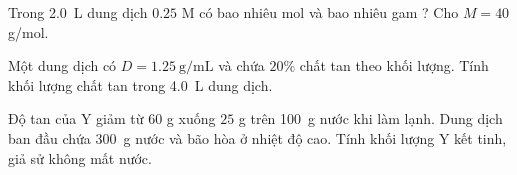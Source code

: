 \begin{tuluyen}
Trong \SI{2.0}{\liter} dung dịch  \(0.25\) M có bao nhiêu mol và bao nhiêu gam ? Cho \(M=40\) g/mol.
\end{tuluyen}

\begin{tuluyen}
Một dung dịch có \(D=\SI{1.25}{\gram\per\milli\liter}\) và chứa \(20\%\) chất tan theo khối lượng. Tính khối lượng chất tan trong \SI{4.0}{\liter} dung dịch.
\end{tuluyen}

\begin{tuluyen}
Độ tan của Y giảm từ \(60\) g xuống \(25\) g trên \SI{100}{\gram} nước khi làm lạnh. Dung dịch ban đầu chứa \SI{300}{\gram} nước và bão hòa ở nhiệt độ cao. Tính khối lượng Y kết tinh, giả sử không mất nước.
\end{tuluyen}

